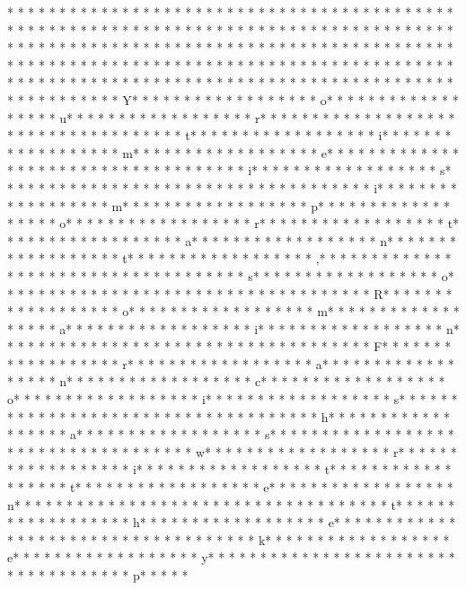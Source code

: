 * * *  * * *  * * *  *  * * *  *  * * *  * 	* * *  * * *  * * *  *  * * *  *  * * *  * 	* * *  * * *  * * *  *  * * *  *  * * *  * 	* * *  * * *  * * *  *  * * *  *  * * *  * * *  * * *  *  * * *  *  * * *  * * *  * * *  *  * * *  *  * * *  *  * * *  * * *  * * *  *  * * *  *  * * *  *  * * *  * * *  * * *  *  * * *  *  * * *  *  * * *  * * *  * * *  *  * * *  *  * * *  *  * * *  * * *  * * *  *  * * *  *  * * *  *  * * *  * * *  * * *  *  * * *  *  * * *  *  * * *  * * *  * * *  *  * * *  *  * * *  *  * * *  * * *  * * *  *  * * *  *  * * *  * Y* * *  * * *  * * *  *  * * *  *  * * *  * o* * *  * * *  * * *  *  * * *  *  * * *  * u* * *  * * *  * * *  *  * * *  *  * * *  * r* * *  * * *  * * *  *  * * *  *  * * *  *  * * *  * * *  * * *  *  * * *  *  * * *  * t* * *  * * *  * * *  *  * * *  *  * * *  * i* * *  * * *  * * *  *  * * *  *  * * *  * m* * *  * * *  * * *  *  * * *  *  * * *  * e* * *  * * *  * * *  *  * * *  *  * * *  *  * * *  * * *  * * *  *  * * *  *  * * *  * i* * *  * * *  * * *  *  * * *  *  * * *  * s* * *  * * *  * * *  *  * * *  *  * * *  *  * * *  * * *  * * *  *  * * *  *  * * *  * i* * *  * * *  * * *  *  * * *  *  * * *  * m* * *  * * *  * * *  *  * * *  *  * * *  * p* * *  * * *  * * *  *  * * *  *  * * *  * o* * *  * * *  * * *  *  * * *  *  * * *  * r* * *  * * *  * * *  *  * * *  *  * * *  * t* * *  * * *  * * *  *  * * *  *  * * *  * a* * *  * * *  * * *  *  * * *  *  * * *  * n* * *  * * *  * * *  *  * * *  *  * * *  * t* * *  * * *  * * *  *  * * *  *  * * *  * ,* * *  * * *  * * *  *  * * *  *  * * *  *  * * *  * * *  * * *  *  * * *  *  * * *  * s* * *  * * *  * * *  *  * * *  *  * * *  * o* * *  * * *  * * *  *  * * *  *  * * *  *  * * *  * * *  * * *  *  * * *  *  * * *  * R* * *  * * *  * * *  *  * * *  *  * * *  * o* * *  * * *  * * *  *  * * *  *  * * *  * m* * *  * * *  * * *  *  * * *  *  * * *  * a* * *  * * *  * * *  *  * * *  *  * * *  * i* * *  * * *  * * *  *  * * *  *  * * *  * n* * *  * * *  * * *  *  * * *  *  * * *  *  * * *  * * *  * * *  *  * * *  *  * * *  * F* * *  * * *  * * *  *  * * *  *  * * *  * r* * *  * * *  * * *  *  * * *  *  * * *  * a* * *  * * *  * * *  *  * * *  *  * * *  * n* * *  * * *  * * *  *  * * *  *  * * *  * c* * *  * * *  * * *  *  * * *  *  * * *  * o* * *  * * *  * * *  *  * * *  *  * * *  * i* * *  * * *  * * *  *  * * *  *  * * *  * s* * *  * * *  * * *  *  * * *  *  * * *  *  * * *  * * *  * * *  *  * * *  *  * * *  * h* * *  * * *  * * *  *  * * *  *  * * *  * a* * *  * * *  * * *  *  * * *  *  * * *  * s* * *  * * *  * * *  *  * * *  *  * * *  *  * * *  * * *  * * *  *  * * *  *  * * *  * w* * *  * * *  * * *  *  * * *  *  * * *  * r* * *  * * *  * * *  *  * * *  *  * * *  * i* * *  * * *  * * *  *  * * *  *  * * *  * t* * *  * * *  * * *  *  * * *  *  * * *  * t* * *  * * *  * * *  *  * * *  *  * * *  * e* * *  * * *  * * *  *  * * *  *  * * *  * n* * *  * * *  * * *  *  * * *  *  * * *  *  * * *  * * *  * * *  *  * * *  *  * * *  * t* * *  * * *  * * *  *  * * *  *  * * *  * h* * *  * * *  * * *  *  * * *  *  * * *  * e* * *  * * *  * * *  *  * * *  *  * * *  *  * * *  * * *  * * *  *  * * *  *  * * *  * k* * *  * * *  * * *  *  * * *  *  * * *  * e* * *  * * *  * * *  *  * * *  *  * * *  * y* * *  * * *  * * *  *  * * *  *  * * *  *  * * *  * * *  * * *  *  * * *  *  * * *  * p* * *  * * 
